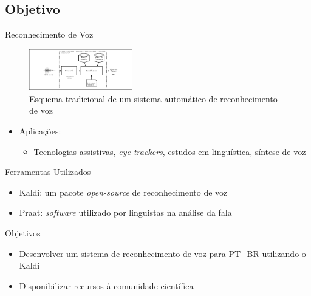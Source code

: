 \subsection{Objetivo}
\begin{frame}{Reconhecimento de Voz}

\begin{figure}
	\includegraphics[width=0.4\textwidth]{Figures/asr}
    \caption{Esquema tradicional de um sistema autom\'atico de reconhecimento de voz}
\end{figure}

\begin{itemize}
    \item Aplica\c c\~oes:
    \begin{itemize}
        \smallskip
        \item Tecnologias assistivas, \textit{eye-trackers}, estudos em lingu\'istica, s\'intese de voz
    \end{itemize}
\end{itemize}
\end{frame}

\begin{frame}{Ferramentas Utilizados}
    \begin{itemize}
        \item Kaldi: um pacote \textit{open-source} de reconhecimento de voz
        \item Praat: \textit{software} utilizado por linguistas na  an\'alise da fala
    \end{itemize}
\end{frame}


\begin{frame}{Objetivos}
\begin{itemize}
    \item Desenvolver um sistema de reconhecimento de voz para PT\_BR utilizando o Kaldi
\end{itemize}

\begin{itemize}
    \item Disponibilizar recursos \`a comunidade cient\'ifica
\end{itemize}
\end{frame}
